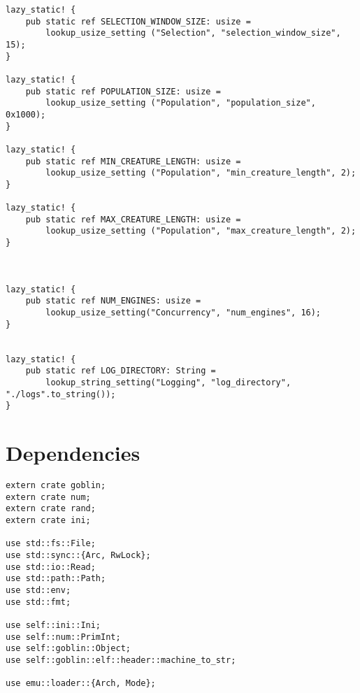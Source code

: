 \documentclass[11pt]{article}
\begin{document}
\begin{lstlisting}
lazy_static! {
    pub static ref SELECTION_WINDOW_SIZE: usize =
        lookup_usize_setting ("Selection", "selection_window_size", 15);
}

lazy_static! {
    pub static ref POPULATION_SIZE: usize =
        lookup_usize_setting ("Population", "population_size", 0x1000);
}

lazy_static! {
    pub static ref MIN_CREATURE_LENGTH: usize =
        lookup_usize_setting ("Population", "min_creature_length", 2);
}

lazy_static! {
    pub static ref MAX_CREATURE_LENGTH: usize =
        lookup_usize_setting ("Population", "max_creature_length", 2);
}



lazy_static! {
    pub static ref NUM_ENGINES: usize =
        lookup_usize_setting("Concurrency", "num_engines", 16);
}


lazy_static! {
    pub static ref LOG_DIRECTORY: String =
        lookup_string_setting("Logging", "log_directory", "./logs".to_string());
}
\end{lstlisting}

\section{Dependencies}
\label{sec:orgb82a587}

\lstset{language=rust,label=orgd8371ab,caption= ,captionpos=b,numbers=none}
\begin{lstlisting}
extern crate goblin;
extern crate num;
extern crate rand;
extern crate ini;

use std::fs::File;
use std::sync::{Arc, RwLock};
use std::io::Read;
use std::path::Path;
use std::env;
use std::fmt;

use self::ini::Ini;
use self::num::PrimInt;
use self::goblin::Object;
use self::goblin::elf::header::machine_to_str;

use emu::loader::{Arch, Mode};
\end{lstlisting}
\end{document}

